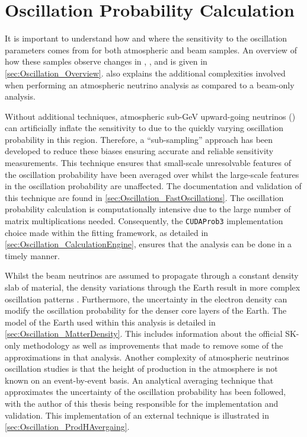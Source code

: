 \chapter{Oscillation Probability Calculation}
\label{chap:OscillationProbability}

It is important to understand how and where the sensitivity to the oscillation parameters comes from for both atmospheric and beam samples. An overview of how these samples observe changes in \dcp, \delmsqatm, and \sinsqatm {} is given in \autoref{sec:Oscillation_Overview}.   also explains the additional complexities involved when performing an atmospheric neutrino analysis as compared to a beam-only analysis.

Without additional techniques, atmospheric sub-GeV upward-going neutrinos () can artificially inflate the sensitivity to \dcp due to the quickly varying oscillation probability in this region. Therefore, a ``sub-sampling'' approach has been developed to reduce these biases ensuring accurate and reliable sensitivity measurements. This technique ensures that small-scale unresolvable features of the oscillation probability have been averaged over whilst the large-scale features in the oscillation probability are unaffected. The documentation and validation of this technique are found in \autoref{sec:Oscillation_FastOscillations}. The oscillation probability calculation is computationally intensive due to the large number of matrix multiplications needed. Consequently, the \texttt{CUDAProb3} implementation choice made within the fitting framework, as detailed in \autoref{sec:Oscillation_CalculationEngine}, ensures that the analysis can be done in a timely manner.

Whilst the beam neutrinos are assumed to propagate through a constant density slab of material, the density variations through the Earth result in more complex oscillation patterns . Furthermore, the uncertainty in the electron density can modify the oscillation probability for the denser core layers of the Earth. The model of the Earth used within this analysis is detailed in \autoref{sec:Oscillation_MatterDensity}. This includes information about the official SK-only methodology as well as improvements that   made to remove some of the approximations   in that analysis. Another complexity of atmospheric neutrinos oscillation studies is that the height of production in the atmosphere is not known on an event-by-event basis. An analytical averaging technique that approximates the uncertainty of the oscillation probability has been followed, with the author of this thesis being responsible for the implementation and validation. This implementation of an external technique is illustrated in \autoref{sec:Oscillation_ProdHAvergaing}.

